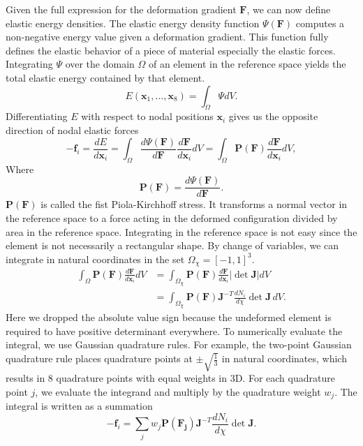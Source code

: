 Given the full expression for the deformation gradient $\mathbf{F}$, we can now define elastic energy densities. 
The elastic energy density function $\Psi(\mathbf{F})$ computes a non-negative energy value given a deformation gradient.
This function fully defines the elastic behavior of a piece of material especially the elastic forces.
Integrating $\Psi$ over the domain $\Omega$ of an element in the reference space yields the total elastic energy contained by that element.
\[
E(\mathbf{x}_1,...,\mathbf{x}_8)=\int_{\Omega}\Psi dV.
\]
Differentiating $E$ with respect to nodal positions $\mathbf{x}_i$ gives us the opposite direction of nodal elastic forces
\[
-\mathbf{f}_i=\frac{dE}{d\mathbf{x}_i}=\int_{\Omega}
\frac{d\Psi(\mathbf{F})}{d\mathbf{F}}
\frac{d\mathbf{F}}{d\mathbf{x}_i}dV
=\int_{\Omega}
\mathbf{P}(\mathbf{F})
\frac{d\mathbf{F}}{d\mathbf{x}_i}dV,
\]
Where
\[
\mathbf{P}(\mathbf{F})=\dfrac{d\Psi(\mathbf{F})}{d\mathbf{F}}.
\]
$\mathbf{P}(\mathbf{F})$ is called the fist Piola-Kirchhoff stress.
It transforms a normal vector in the reference space to a force acting in the deformed configuration divided by area in the reference space.
Integrating in the reference space is not easy since the element is not necessarily a rectangular shape. By change of variables, we can integrate in natural coordinates
in the set $\Omega_{\chi}=[-1,1]^3$.
\begin{align*}
\int_{\Omega}
\mathbf{P}(\mathbf{F})
\frac{d\mathbf{F}}{d\mathbf{x}_i}dV
&=\int_{\Omega_{\chi}}
\mathbf{P}(\mathbf{F})
\frac{d\mathbf{F}}{d\mathbf{x}_i}|\det{\mathbf{J}}|dV\\
&=\int_{\Omega_{\chi}}
\mathbf{P}(\mathbf{F})\mathbf{J}^{-T}
\frac{dN_i}{d\chi}\det{\mathbf{J}}\,dV.
\end{align*}
Here we dropped the absolute value sign because the undeformed element is required to have positive determinant everywhere.
To numerically evaluate the integral, we use Gaussian quadrature rules.
For example, the two-point Gaussian quadrature rule places quadrature points at
$\pm \sqrt{\frac{1}{3}}$ in natural coordinates, which results in $8$ quadrature points with equal weights in 3D.
For each quadrature point $j$, we evaluate the integrand and multiply by the quadrature weight $w_j$. The integral is written as a summation
\[
-\mathbf{f}_i=\sum_j w_j\mathbf{P(\mathbf{F}_j)}\mathbf{J}^{-T}
\frac{dN_i}{d\chi}\det{\mathbf{J}}.
\]

